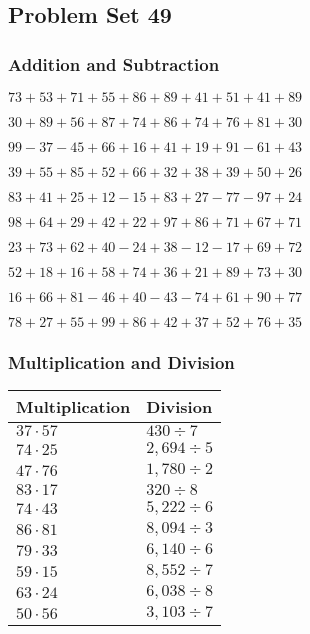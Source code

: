 \hypertarget{problem-set-49}{%
\subsection{Problem Set 49}\label{problem-set-49}}

\hypertarget{addition-and-subtraction}{%
\subsubsection{Addition and
Subtraction}\label{addition-and-subtraction}}

\(73+53+71+55+86+89+41+51+41+89\)

\(30+89+56+87+74+86+74+76+81+30\)

\(99-37-45+66+16+41+19+91-61+43\)

\(39+55+85+52+66+32+38+39+50+26\)

\(83+41+25+12-15+83+27-77-97+24\)

\(98+64+29+42+22+97+86+71+67+71\)

\(23+73+62+40-24+38-12-17+69+72\)

\(52+18+16+58+74+36+21+89+73+30\)

\(16+66+81-46+40-43-74+61+90+77\)

\(78+27+55+99+86+42+37+52+76+35\)

\hypertarget{multiplication-and-division}{%
\subsubsection{Multiplication and
Division}\label{multiplication-and-division}}

\begin{longtable}[]{@{}ll@{}}
\toprule
Multiplication & Division\tabularnewline
\midrule
\endhead
\(37\cdot57\) & \(430÷7\)\tabularnewline
\(74\cdot25\) & \(2,694÷5\)\tabularnewline
\(47\cdot76\) & \(1,780÷2\)\tabularnewline
\(83\cdot17\) & \(320÷8\)\tabularnewline
\(74\cdot43\) & \(5,222÷6\)\tabularnewline
\(86\cdot81\) & \(8,094÷3\)\tabularnewline
\(79\cdot33\) & \(6,140÷6\)\tabularnewline
\(59\cdot15\) & \(8,552÷7\)\tabularnewline
\(63\cdot24\) & \(6,038÷8\)\tabularnewline
\(50\cdot56\) & \(3,103÷7\)\tabularnewline
\bottomrule
\end{longtable}
